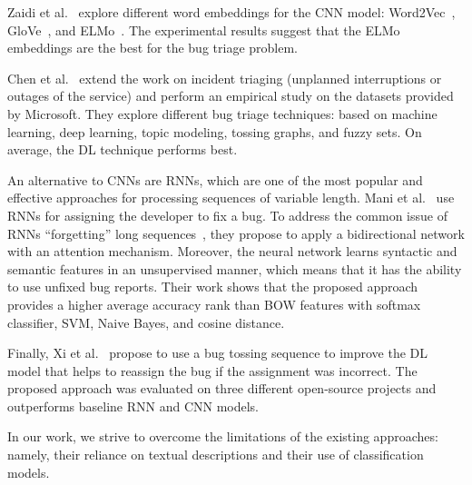 Zaidi et al.~\cite{Zaidi2020ApplyingCN} explore different word embeddings for the CNN model: Word2Vec~\cite{Mikolov2013EfficientEO}, GloVe~\cite{Pennington2014GloVeGV}, and ELMo~\cite{Peters2018DeepCW}. The experimental results suggest that the ELMo embeddings are the best for the bug triage problem. 

Chen et al.~\cite{Chen2019AnEI} extend the work on incident triaging (unplanned interruptions or outages of the service) and perform an empirical study on the datasets provided by Microsoft. They explore different bug triage techniques: based on machine learning, deep learning, topic modeling, tossing graphs, and fuzzy sets. On average, the DL technique performs best. 

An alternative to CNNs are RNNs, which are one of the most popular and effective approaches for processing sequences of variable length. Mani et al.~\cite{Mani2019DeepTriageET} use RNNs for assigning the developer to fix a bug. To address the common issue of RNNs ``forgetting'' long sequences~\cite{Hochreiter2001GradientFI}, they propose to apply a bidirectional network with an attention mechanism. Moreover, the neural network learns syntactic and semantic features in an unsupervised manner, which means that it has the ability to use unfixed bug reports. Their work shows that the proposed approach provides a higher average accuracy rank than BOW features with softmax classifier, SVM, Naive Bayes, and cosine distance.

Finally, Xi et al.~\cite{Xi2019BugTB} propose to use a bug tossing sequence to improve the DL model that helps to reassign the bug if the assignment was incorrect. The proposed approach was evaluated on three different open-source projects and outperforms baseline RNN and CNN models. 

In our work, we strive to overcome the limitations of the existing approaches: namely, their reliance on textual descriptions and their use of classification models.